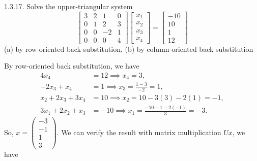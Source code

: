 \documentclass{report}
\begin{document}
    \pagebreak \bigbreak \noindent 
    \begin{mdframed}
        1.3.17. Solve the upper-triangular system
        \[
            \begin{bmatrix}
                3 & 2 & 1 & 0 \\
                0 & 1 & 2 & 3 \\
                0 & 0 & -2 & 1 \\
                0 & 0 & 0 & 4
            \end{bmatrix}
            \begin{bmatrix}
                x_{1} \\
                x_{2} \\
                x_{3} \\
                x_{4}
            \end{bmatrix}
            =
            \begin{bmatrix}
                -10 \\
                10 \\
                1 \\
                12
            \end{bmatrix}
        \]
        (a) by row-oriented back substitution, (b) by column-oriented back substitution
    \end{mdframed}
    \bigbreak \noindent 
    By row-oriented back substitution, we have
    \begin{align*}
        4x_{4} &= 12 \implies x_{4} = 3, \\
        -2x_{3} + x_{4} &= 1 \implies x_{3} = \frac{1-3}{-2} = 1, \\
        x_{2} +2x_{3} + 3x_{4} &= 10 \implies x_{2} = 10-3(3)-2(1) = -1, \\
        3x_{1} + 2x_{2} + x_{3} &= -10 \implies x_{1} = \frac{-10 -1 -2(-1)}{3} = -3
    .\end{align*}
    So, $x = \begin{pmatrix} -3 \\ -1 \\ 1 \\ 3 \end{pmatrix} $. We can verify the result with matrix multiplication $Ux$, we have
\end{document}
